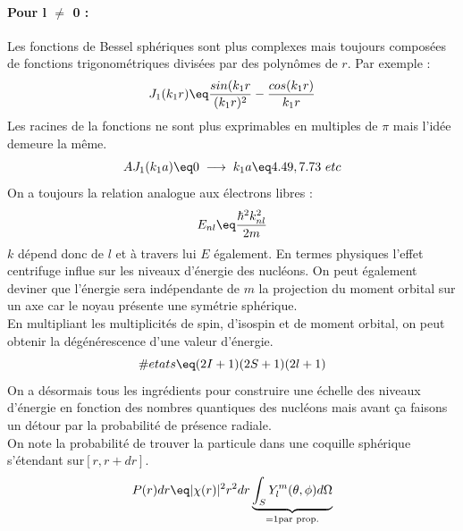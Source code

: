 \paragraph{Pour l $\neq$ 0 :} Les fonctions de Bessel sphériques sont plus complexes mais toujours composées de fonctions trigonométriques divisées par des polynômes de $r$. Par exemple :
\begin{equation*}
    J_1(k_1 r) \eq \frac{sin(k_1 r}{(k_1 r)^2} - \frac{cos(k_1r)}{k_1r}
\end{equation*}
Les racines de la fonctions ne sont plus exprimables en multiples de $\pi$ mais l'idée demeure la même.
\begin{equation*}
    AJ_1(k_1a) \eq 0 \; \longrightarrow \; k_1 a \eq 4.49,7.73 \ etc
\end{equation*}
On a toujours la relation analogue aux électrons libres :
\begin{equation*}
    E_{nl} \eq \frac{\hbar^2k_{nl}^2}{2m}
\end{equation*}
$k$ dépend donc de $l$ et à travers lui $E$ également. En termes physiques l'effet centrifuge influe sur les niveaux d'énergie des nucléons. On peut également deviner que l'énergie sera indépendante de $m$ la projection du moment orbital sur un axe car le noyau présente une symétrie sphérique.\\
En multipliant les multiplicités de spin, d'isospin et de moment orbital, on peut obtenir la dégénérescence d'une valeur d'énergie.
\begin{equation*}
    \#etats \eq (2I+1)(2S+1)(2l+1)
\end{equation*}
On a désormais tous les ingrédients pour construire une échelle des niveaux d'énergie en fonction des nombres quantiques des nucléons mais avant ça faisons un détour par la probabilité de présence radiale.\\
On note la probabilité de trouver la particule dans une coquille sphérique s'étendant sur$ [r,r+dr]$.
\begin{equation*}
    P(r)dr \eq |\chi(r)|^2 r^2 dr \underbrace{\int_S Y_l^m(\theta,\phi)d\Omega}_{= 1 \text{par prop.}}
\end{equation*}
